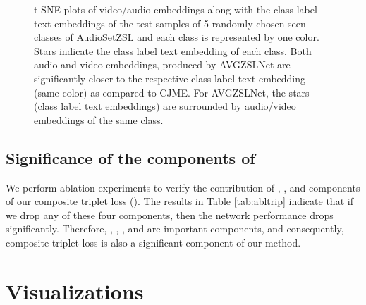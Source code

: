 \documentclass[10pt,twocolumn,letterpaper]{article}
\begin{document}
\begin{figure*}[htb]
     \centering
        \caption{t-SNE plots of video/audio embeddings along with the class label text embeddings of the test samples of 5 randomly chosen seen classes of AudioSetZSL and each class is represented by one color. Stars indicate the class label text embedding of each class. Both audio and video embeddings, produced by AVGZSLNet are significantly closer to the respective class label text embedding (same color) as compared to CJME. For AVGZSLNet, the stars (class label text embeddings) are surrounded by audio/video embeddings of the same class.}
        \label{fig:tsne}
        \vspace{-10pt}
\end{figure*}




\subsection{Significance of the components of }
We perform ablation experiments to verify the contribution of , ,  and  components of our composite triplet loss (). The results in Table \ref{tab:abltrip} indicate that if we drop any of these four components, then the network performance drops significantly. Therefore, , , , and  are important components, and consequently, composite triplet loss is also a significant component of our method.

\section{Visualizations}
\end{document}
